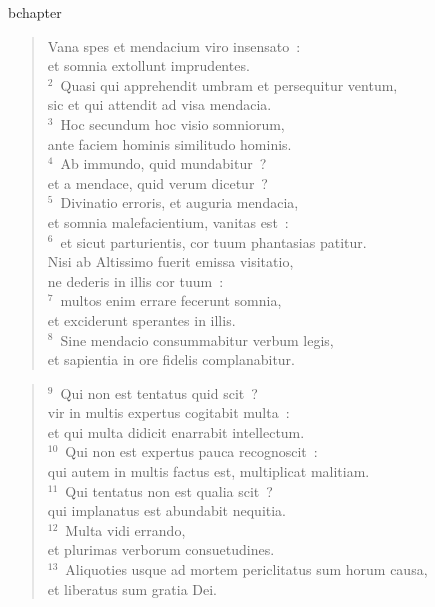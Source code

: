 bchapter\begin{verse}\vspace{-19pt}Vana spes et mendacium viro insensato~:\\ et somnia extollunt imprudentes.\\
${}^{2}$~Quasi qui apprehendit umbram et persequitur ventum,\\ sic et qui attendit ad visa mendacia.\\
${}^{3}$~Hoc secundum hoc visio somniorum,\\ ante faciem hominis similitudo hominis.\\
${}^{4}$~Ab immundo, quid mundabitur~?\\ et a mendace, quid verum dicetur~?\\
${}^{5}$~Divinatio erroris, et auguria mendacia,\\ et somnia malefacientium, vanitas est~:\\
${}^{6}$~et sicut parturientis, cor tuum phantasias patitur.\\ Nisi ab Altissimo fuerit emissa visitatio,\\ ne dederis in illis cor tuum~:\\
${}^{7}$~multos enim errare fecerunt somnia,\\ et exciderunt sperantes in illis.\\
${}^{8}$~Sine mendacio consummabitur verbum legis,\\ et sapientia in ore fidelis complanabitur.\end{verse}


\begin{verse}${}^{9}$~Qui non est tentatus quid scit~?\\ vir in multis expertus cogitabit multa~:\\ et qui multa didicit enarrabit intellectum.\\
${}^{10}$~Qui non est expertus pauca recognoscit~:\\ qui autem in multis factus est, multiplicat malitiam.\\
${}^{11}$~Qui tentatus non est qualia scit~?\\ qui implanatus est abundabit nequitia.\\
${}^{12}$~Multa vidi errando,\\ et plurimas verborum consuetudines.\\
${}^{13}$~Aliquoties usque ad mortem periclitatus sum horum causa,\\ et liberatus sum gratia Dei.\end{verse}


